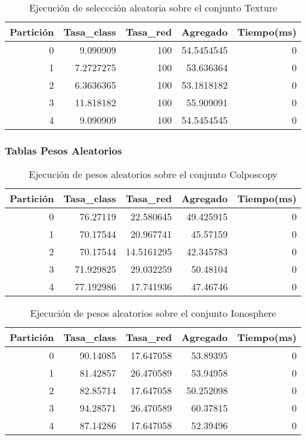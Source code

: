 \documentclass[size=a4, parskip=half, titlepage=false, toc=flat, toc=bib, 12pt]{scrartcl}
\begin{document}
 \begin{table}[ht]
  \centering
  \begin{tabular}[t]{rrrrr}
  \toprule
  Partición &Tasa\_class &Tasa\_red & Agregado & Tiempo(ms)\\
  \midrule
0         & 9.090909  & 100        & 54.5454545 & 0      \\
1         & 7.2727275 & 100        & 53.636364  & 0      \\
2         & 6.3636365 & 100        & 53.1818182 & 0      \\
3         & 11.818182 & 100        & 55.909091  & 0      \\
4         & 9.090909  & 100        & 54.5454545 & 0      \\
  \bottomrule
  \end{tabular}
  \caption{Ejecución de seleccción aleatoria sobre el conjunto Texture}
  \end{table}%

\newpage

\subsubsection{Tablas Pesos Aleatorios}

 \begin{table}[ht]
  \centering
  \begin{tabular}[t]{rrrrr}
  \toprule
  Partición &Tasa\_class &Tasa\_red & Agregado & Tiempo(ms)\\
  \midrule
0         & 76.27119  & 22.580645  & 49.425915 & 0      \\
1         & 70.17544  & 20.967741  & 45.57159  & 0      \\
2         & 70.17544  & 14.5161295 & 42.345783 & 0      \\
3         & 71.929825 & 29.032259  & 50.48104  & 0      \\
4         & 77.192986 & 17.741936  & 47.46746  & 0      \\
  \bottomrule
  \end{tabular}
  \caption{Ejecución de pesos aleatorios sobre el conjunto Colposcopy }
  \end{table}%

 \begin{table}[ht]
  \centering
  \begin{tabular}[t]{rrrrr}
  \toprule
  Partición &Tasa\_class &Tasa\_red & Agregado & Tiempo(ms)\\
  \midrule
0         & 90.14085  & 17.647058 & 53.89395  & 0      \\
1         & 81.42857  & 26.470589 & 53.94958  & 0      \\
2         & 82.85714  & 17.647058 & 50.252098 & 0      \\
3         & 94.28571  & 26.470589 & 60.37815  & 0      \\
4         & 87.14286  & 17.647058 & 52.39496  & 0      \\
  \bottomrule
  \end{tabular}
  \caption{Ejecución de pesos aleatorios sobre el conjunto Ionosphere}
  \end{table}%
\end{document}
